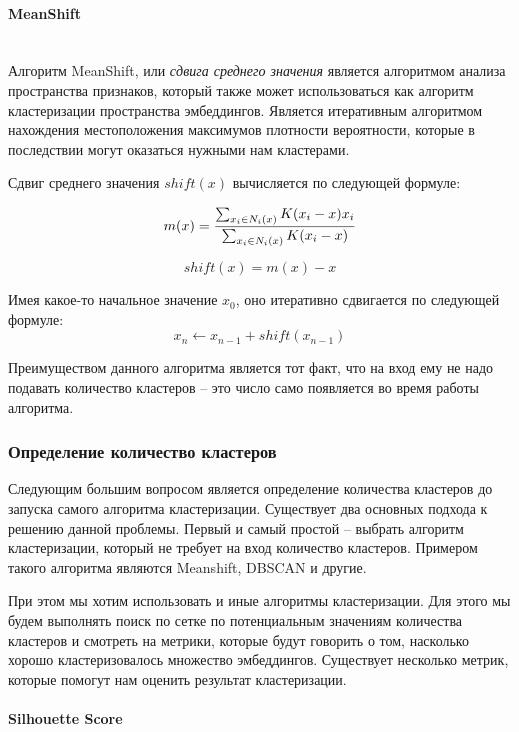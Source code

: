 \paragraph{MeanShift}\mbox{} \\

Алгоритм MeanShift, или \textit{сдвига среднего значения} является алгоритмом анализа пространства признаков, который также может использоваться как алгоритм кластеризации пространства эмбеддингов. Является итеративным алгоритмом нахождения местоположения максимумов плотности вероятности, которые в последствии могут оказаться нужными нам кластерами. 

Сдвиг среднего значения $shift(x)$ вычисляется по следующей формуле:

$$
m(x) = \frac{\sum_{x_i \in N_i(x)} K(x_i - x)x_i}{\sum_{x_i \in N_i(x)} K(x_i - x)}\\
$$

$$
shift(x) = m(x) - x
$$

\noindent
Имея какое-то начальное значение $x_0$, оно итеративно сдвигается по следующей формуле:
$$
x_n \leftarrow x_{n - 1} + shift(x_{n - 1})
$$

Преимуществом данного алгоритма является тот факт, что на вход ему не надо подавать количество кластеров -- это число само появляется во время работы алгоритма.

\subsubsection{Определение количество кластеров}

Следующим большим вопросом является определение количества кластеров до запуска самого алгоритма кластеризации. Существует два основных подхода к решению данной проблемы. Первый и самый простой -- выбрать алгоритм кластеризации, который не требует на вход количество кластеров. Примером такого алгоритма являются Meanshift, DBSCAN и другие.

При этом мы хотим использовать и иные алгоритмы кластеризации. Для этого мы будем выполнять поиск по сетке по потенциальным значениям количества кластеров и смотреть на метрики, которые будут говорить о том, насколько хорошо кластеризовалось множество эмбеддингов. Существует несколько метрик, которые помогут нам оценить результат кластеризации.

\paragraph{Silhouette Score}\mbox{} \\

